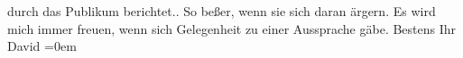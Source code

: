 \begin{ledgroupsized}[t]{13cm}
{{{                  durch das Publikum berichtet.}}}\label{K_L00902_1h}. So beßer, wenn sie sich daran ärgern.\pend
           \pstart
           Es wird mich immer freuen, wenn sich Gelegenheit zu einer Aussprache gäbe.\pend
           \pstart
           Bestens Ihr{\\[\baselineskip]}\spacefill\mbox{David}\pend
           \leftskip=0em{}\endnumbering{}\end{ledgroupsized}  \newcommand{\dateiname}{L00902}\newcommand{\titel}{Jakob Julius David an Arthur Schnitzler, [8. 3. 1899?]}\newcommand{\editorInnen}{Martin Anton Müller und Gerd-Hermann Susen}
            \footnotesize
\begin{ledgroupsized}[t]{11.5cm}
\end{ledgroupsized}
         
      